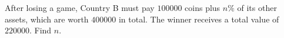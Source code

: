 After losing a game, Country B must pay $100000$ coins plus $n\%$ of its other assets, which are worth $400000$ in total. The winner receives a total value of $220000$. Find $n$.
